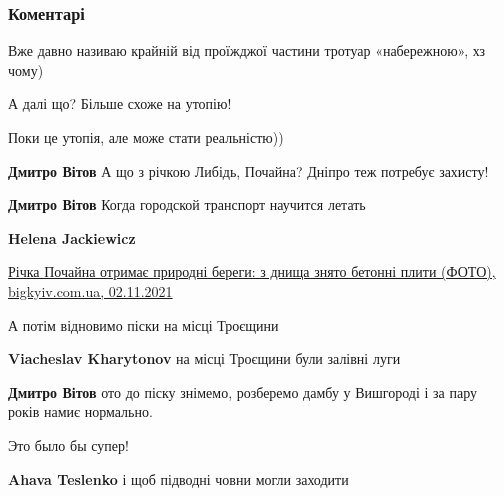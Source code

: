  
 
 
 
 
\subsubsection{Коментарі}
\label{sec:15_11_2021.fb.vitov_dmytro.1.koncepcia_rechka_kreschatik.cmt}

\begin{itemize} %
Вже давно називаю крайній від проїжджої частини тротуар «набережною», хз чому)

А далі що? Більше схоже на утопію!

\begin{itemize} %
Поки це утопія, але може стати реальністю))

\textbf{Дмитро Вітов} А що з річкою Либідь, Почайна? Дніпро теж потребує захисту!

\textbf{Дмитро Вітов} Когда городской транспорт научится летать

\textbf{Helena Jackiewicz}

\href{https://bigkyiv.com.ua/richka-pochajna-otrymaye-pryrodni-beregy-z-dnyshha-znyato-betonni-plyty-foto/}{%
Річка Почайна отримає природні береги: з днища знято бетонні плити (ФОТО), bigkyiv.com.ua, 02.11.2021%
}

\end{itemize} %

А потім відновимо піски на місці Троєщини

\begin{itemize} %
\textbf{Viacheslav Kharytonov} на місці Троєщини були залівні луги

\textbf{Дмитро Вітов} ото до піску знімемо, розберемо дамбу у Вишгороді і за пару років намиє нормально.
\end{itemize} %

Это было бы супер!

\textbf{Ahava Teslenko} і щоб підводні човни могли заходити


\end{itemize}
